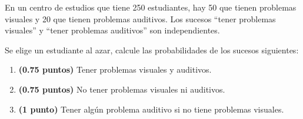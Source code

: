 
En un centro de estudios que tiene 250 estudiantes, hay 50 que tienen problemas visuales y 20 que tienen problemas auditivos. Los sucesos ``tener problemas visuales'' y ``tener problemas auditivos'' son independientes.

Se elige un estudiante al azar, calcule las probabilidades de los sucesos siguientes:
\begin{enumerate}[label=\alph*)]
\item \textbf{(0.75 puntos)} Tener problemas visuales y auditivos.
\item \textbf{(0.75 puntos)} No tener problemas visuales ni auditivos.
\item \textbf{(1 punto)} Tener algún problema auditivo si no tiene problemas visuales.
\end{enumerate}
